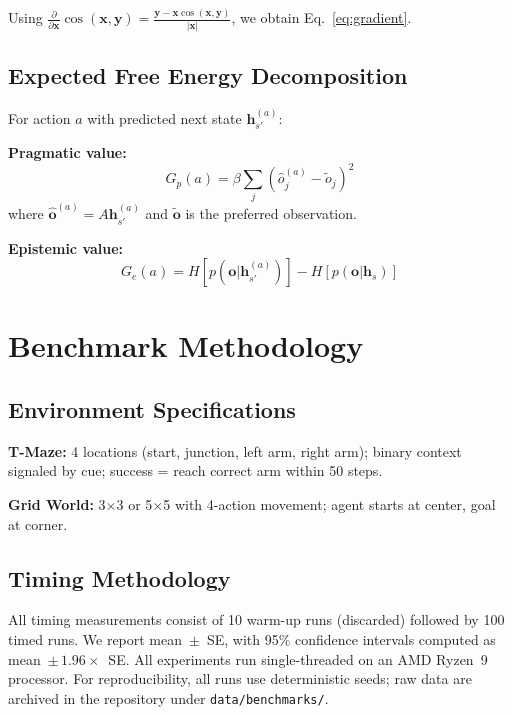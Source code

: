 \documentclass[10pt,letterpaper]{article}
\newcommand{\hvec}[1]{\mathbf{h}_{#1}}
\begin{document}
Using $\frac{\partial}{\partial \mathbf{x}}\cos(\mathbf{x}, \mathbf{y}) = \frac{\mathbf{y} - \mathbf{x}\cos(\mathbf{x}, \mathbf{y})}{|\mathbf{x}|}$, we obtain Eq.~\ref{eq:gradient}.

\subsection{Expected Free Energy Decomposition}

For action $a$ with predicted next state $\hvec{s'}^{(a)}$:

\textbf{Pragmatic value:}
\begin{equation}
G_p(a) = \beta \sum_j (\hat{o}_j^{(a)} - \tilde{o}_j)^2
\end{equation}
where $\hat{\mathbf{o}}^{(a)} = A\hvec{s'}^{(a)}$ and $\tilde{\mathbf{o}}$ is the preferred observation.

\textbf{Epistemic value:}
\begin{equation}
G_e(a) = H[p(\mathbf{o}|\hvec{s'}^{(a)})] - H[p(\mathbf{o}|\hvec{s})]
\end{equation}

\section{Benchmark Methodology}
\label{app:methodology}

\subsection{Environment Specifications}

\textbf{T-Maze:} 4 locations (start, junction, left arm, right arm); binary context signaled by cue; success = reach correct arm within 50 steps.

\textbf{Grid World:} 3$\times$3 or 5$\times$5 with 4-action movement; agent starts at center, goal at corner.

\subsection{Timing Methodology}

All timing measurements consist of 10 warm-up runs (discarded) followed by 100 timed runs. We report mean~$\pm$~SE, with 95\% confidence intervals computed as mean~$\pm\,1.96 \times$~SE. All experiments run single-threaded on an AMD Ryzen~9 processor. For reproducibility, all runs use deterministic seeds; raw data are archived in the repository under \texttt{data/\allowbreak benchmarks/}.
\end{document}
